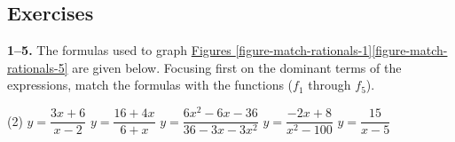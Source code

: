 \documentclass[10pt,oneside,]{book}
\theoremstyle{plain}
\theoremstyle{definition}
\numberwithin{equation}{section}
\begin{document}
\subsection[Exercises]{Exercises}\label{exercises-60}
\textbf{1--5. }\hypertarget{exercisegroup-119}{\null}The formulas used to graph \hyperref[figure-match-rationals-1]{Figures \ref{figure-match-rationals-1}}\textendash{}\hyperref[figure-match-rationals-5]{\ref{figure-match-rationals-5}} are given below.  Focusing first on the dominant terms of the expressions, match the formulas with the functions (\(f_1\) through \(f_5\)).%
\par
\begin{exercisegroup}(2)
\exercise[1.]\hypertarget{exercise-608}{\null}\(y=\dfrac{3x+6}{x-2}\)%
\exercise[2.]\hypertarget{exercise-609}{\null}\(y=\dfrac{16+4x}{6+x}\)%
\exercise[3.]\hypertarget{exercise-610}{\null}\(y=\dfrac{6x^2-6x-36}{36-3x-3x^2}\)%
\exercise[4.]\hypertarget{exercise-611}{\null}\(y=\dfrac{-2x+8}{x^2-100}\)%
\exercise[5.]\hypertarget{exercise-612}{\null}\(y=\dfrac{15}{x-5}\)%
\end{exercisegroup}
\end{document}
